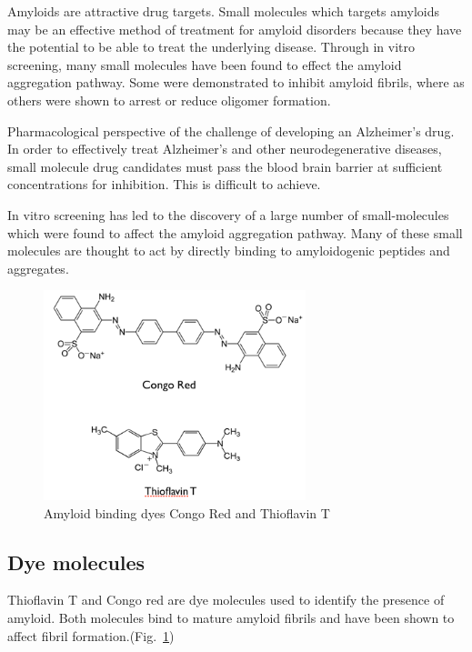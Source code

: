 Amyloids are attractive drug targets. Small molecules which targets amyloids may be an effective method of treatment for amyloid disorders because they have the potential to be able to treat the underlying disease. Through in vitro screening, many small molecules have been found to effect the amyloid aggregation pathway.  Some were demonstrated to inhibit amyloid fibrils, where as others were shown to arrest or reduce oligomer formation.
  
Pharmacological perspective of the challenge of developing an Alzheimer's drug. In order to effectively treat Alzheimer's and other neurodegenerative diseases, small molecule drug candidates must pass the blood brain barrier at sufficient concentrations for inhibition.  This is difficult to achieve.
      
In vitro screening has led to the discovery of a large number of small-molecules which were found to affect the amyloid aggregation pathway. Many of these small molecules are thought to act by directly binding to amyloidogenic peptides and aggregates.

\begin{figure}
\centering
\includegraphics[width=3in]{figures/introduction/dyes.png}
\caption[Small molecule binders]{Amyloid binding dyes Congo Red and Thioflavin T}
\label{fig:amyloid_dyes}
\end{figure}

\subsection{Dye molecules}
Thioflavin T and Congo red are dye molecules used to identify the presence of amyloid.  Both molecules bind to mature amyloid fibrils and have been shown to affect fibril formation.(Fig.~\ref{fig:amyloid_dyes})

